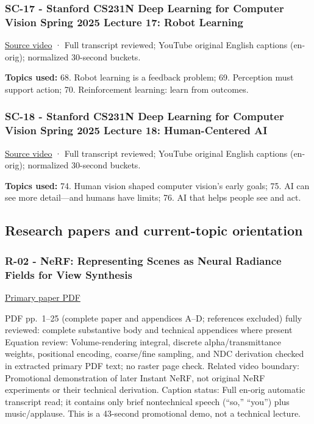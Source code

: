 \subsubsection{SC-17 - Stanford CS231N Deep Learning for Computer Vision Spring 2025 Lecture 17: Robot Learning}\label{04-visual-computing-ii-ch036-sc-17---stanford-cs231n-deep-learning-for-computer-vision-spring-2025-lecture-17-robot-learning}

\href{https://www.youtube.com/watch?v=XSfmOH_xVSU}{Source video} · Full transcript reviewed; YouTube original English captions (en-orig); normalized 30-second buckets.

\textbf{Topics used:} 68. Robot learning is a feedback problem; 69. Perception must support action; 70. Reinforcement learning: learn from outcomes.

\subsubsection{SC-18 - Stanford CS231N Deep Learning for Computer Vision Spring 2025 Lecture 18: Human-Centered AI}\label{04-visual-computing-ii-ch036-sc-18---stanford-cs231n-deep-learning-for-computer-vision-spring-2025-lecture-18-human-centered-ai}

\href{https://www.youtube.com/watch?v=g8UaBfj6Sh8}{Source video} · Full transcript reviewed; YouTube original English captions (en-orig); normalized 30-second buckets.

\textbf{Topics used:} 74. Human vision shaped computer vision's early goals; 75. AI can see more detail---and humans have limits; 76. AI that helps people see and act.

\subsection{Research papers and current-topic orientation}\label{04-visual-computing-ii-ch036-research-papers-and-current-topic-orientation}

\subsubsection{R-02 - NeRF: Representing Scenes as Neural Radiance Fields for View Synthesis}\label{04-visual-computing-ii-ch036-r-02---nerf-representing-scenes-as-neural-radiance-fields-for-view-synthesis}

\href{https://arxiv.org/pdf/2003.08934}{Primary paper PDF}

PDF pp.~1--25 (complete paper and appendices A--D; references excluded) fully reviewed: complete substantive body and technical appendices where present Equation review: Volume-rendering integral, discrete alpha/transmittance weights, positional encoding, coarse/fine sampling, and NDC derivation checked in extracted primary PDF text; no raster page check. Related video boundary: Promotional demonstration of later Instant NeRF, not original NeRF experiments or their technical derivation. Caption status: Full en-orig automatic transcript read; it contains only brief nontechnical speech (``so,'' ``you'') plus music/applause. This is a 43-second promotional demo, not a technical lecture.


